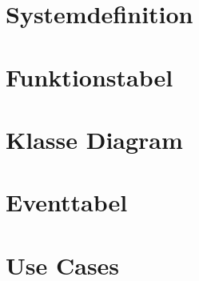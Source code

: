
\section{Systemdefinition}

\section{Funktionstabel}

\section{Klasse Diagram}

\section{Eventtabel}

\section{Use Cases}